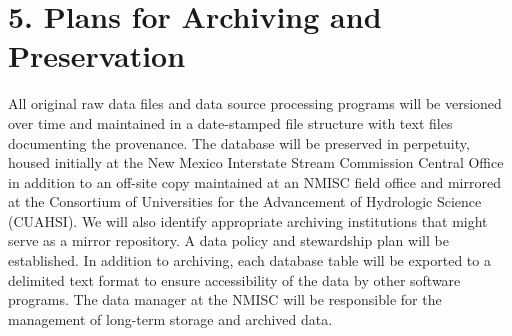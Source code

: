 \documentclass[]{article}
\begin{document}
\section{5. Plans for Archiving and
Preservation}\label{plans-for-archiving-and-preservation}

All original raw data files and data source processing programs will be
versioned over time and maintained in a date-stamped file structure with
text files documenting the provenance. The database will be preserved in
perpetuity, housed initially at the New Mexico Interstate Stream
Commission Central Office in addition to an off-site copy maintained at
an NMISC field office and mirrored at the Consortium of Universities for
the Advancement of Hydrologic Science (CUAHSI). We will also identify
appropriate archiving institutions that might serve as a mirror
repository. A data policy and stewardship plan will be established. In
addition to archiving, each database table will be exported to a
delimited text format to ensure accessibility of the data by other
software programs. The data manager at the NMISC will be responsible for
the management of long-term storage and archived data.
\end{document}
